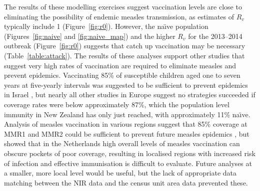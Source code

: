 \documentclass{article}
\begin{document}
\begin{itemize}
The results of these modelling exercises suggest vaccination levels are close to eliminating the possibility of endemic measles transmission, as estimates of $R_v$ typically include 1 (Figure~\ref{fig:r0}). However, the na\"{\i}ve population (Figures~\ref{fig:naive} and \ref{fig:naive_map}) and the higher $R_v$ for the 2013--2014 outbreak (Figure~\ref{fig:r0}) suggests that catch up vaccination may be necessary (Table~\ref{table:attack}). The results of these analyses support other studies that suggest very high rates of vaccination are required to eliminate measles and prevent epidemics. Vaccinating 85\% of susceptible children aged one to seven years at five-yearly intervals was suggested to be sufficient to prevent epidemics in Israel \citep{agur93}, but nearly all other studies in Europe suggest no strategies succeeded if coverage rates were below approximately 87\%, which the population level immunity in New Zealand has only just reached, with approximately 11\% na\"{\i}ve. Analysis of measles vaccination in various regions suggest that 85\% coverage at MMR1 and MMR2 could be sufficient to prevent future measles epidemics \citep{agur93, babad95, edmunds0, gay98, wallinga1}, but \citep{glass4} showed that in the Netherlands high overall levels of measles vaccination can obscure pockets of poor coverage, resulting in localised regions with increased risk of infection and effective immunisation is difficult to evaluate. Future analyses at a smaller, more local level would be useful, but the lack of appropriate data matching between the NIR data and the census unit area data prevented these.

\begin{table}[htdp]

\begin{center}


\end{center}
\end{table}
\end{itemize}
\end{document}
